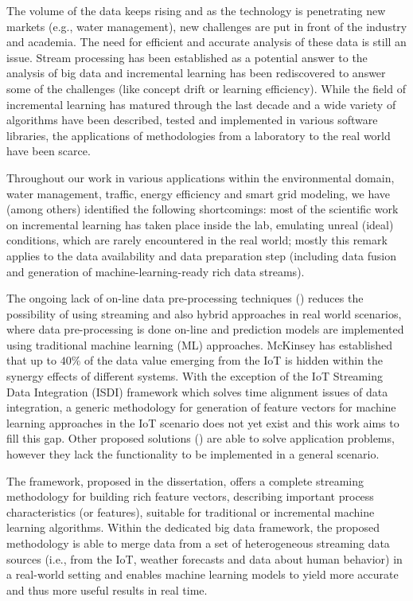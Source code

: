 The volume of the data keeps rising and as the technology is penetrating new markets (e.g., water management), new challenges are put in front of the industry and academia. 
The need for efficient and accurate analysis of these data is still an issue. 
Stream processing has been established as a potential answer to the analysis of big data and incremental learning has been rediscovered to answer some of the challenges (like concept drift or learning efficiency). 
While the field of incremental learning has matured through the last decade and a wide variety of algorithms have been described, tested and implemented in various software libraries, the applications of methodologies from a laboratory to the real world have been scarce.

Throughout our work in various applications within the environmental domain, water management, traffic, energy efficiency and smart grid modeling, we have (among others) identified the following shortcomings: most of the scientific work on incremental learning has taken place inside the lab, emulating unreal (ideal) conditions, which are rarely encountered in the real world; mostly this remark applies to the data availability and data preparation step (including data fusion and generation of machine-learning-ready rich data streams).

The ongoing lack of on-line data pre-processing techniques (\cite{kolajo:2019:big, bahri:2021:data}) reduces the possibility of using streaming and also hybrid approaches in real world scenarios, where data pre-processing is done on-line and prediction models are implemented using traditional machine learning (ML) approaches. 
McKinsey \cite{manyika:2015:unlocking} has established that up to $40\%$ of the data value emerging from the IoT is hidden within the synergy effects of different systems. 
With the exception of the IoT Streaming Data Integration (ISDI) framework \cite{tu:2020:isdi} which solves time alignment issues of data integration, a generic methodology for generation of feature vectors for machine learning approaches in the IoT scenario does not yet exist and this work aims to fill this gap.
Other proposed solutions (\cite{zhang:2019:advanced, wu:2018:sensor, zhou:2018:multimodal, wu:2019:fusion, akbar:2018:real}) are able to solve application problems, however they lack the functionality to be implemented in a general scenario.

The framework, proposed in the dissertation, offers a complete streaming methodology for building rich feature vectors, describing important process characteristics (or features), suitable for traditional or incremental machine learning algorithms. 
Within the dedicated big data framework, the proposed methodology is able to merge data from a set of heterogeneous streaming data sources (i.e., from the IoT, weather forecasts and data about human behavior) in a real-world setting and enables machine learning models to yield more accurate and thus more useful results in real time.

